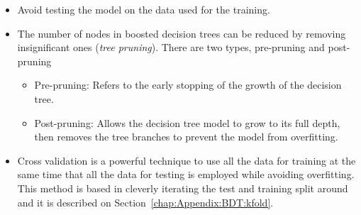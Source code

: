 \begin{itemize}
	\item Avoid testing the model on the data used for the training.
	\item The number of nodes in boosted decision trees can be reduced by removing 
		insignificant ones (\textit{tree pruning}). There are two types, pre-pruning and post-pruning
		\begin{itemize}
			\item Pre-pruning: Refers to the early stopping of the growth of the decision tree.
			\item Post-pruning: Allows the decision tree model to grow to its full depth, then removes 
				the tree branches to prevent the model from overfitting.
		\end{itemize}
	\item Cross validation is a powerful technique to use all the data for training at the same 
		time that all the data for testing is employed while avoiding overfitting. This method is
		based in cleverly iterating the test and training split around and it is described on 
		Section~\ref{chap:Appendix:BDT:kfold}.
\end{itemize}
















